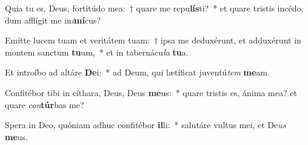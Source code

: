 \item Quia tu es, Deus, fortitúdo mea:~† quare me repu\textbf{lís}ti?~* et quare tristis incédo, dum afflígit me in\textit{i}\textbf{mí}cus?
\item Emítte lucem tuam et veritátem tuam:~† ipsa me deduxérunt, et adduxérunt in montem sanctum \textbf{tu}um,~* et in tabernácu\textit{la} \textbf{tu}a.
\item Et introíbo ad altáre \textbf{De}i:~* ad Deum, qui lætíficat juventú\textit{tem} \textbf{me}am.
\item Confitébor tibi in cíthara, Deus, Deus \textbf{me}us:~* quare tristis es, ánima mea? et quare \textit{con}\textbf{túr}bas me?
\item Spera in Deo, quóniam adhuc confitébor \textbf{il}li:~* salutáre vultus mei, et De\textit{us} \textbf{me}us.
